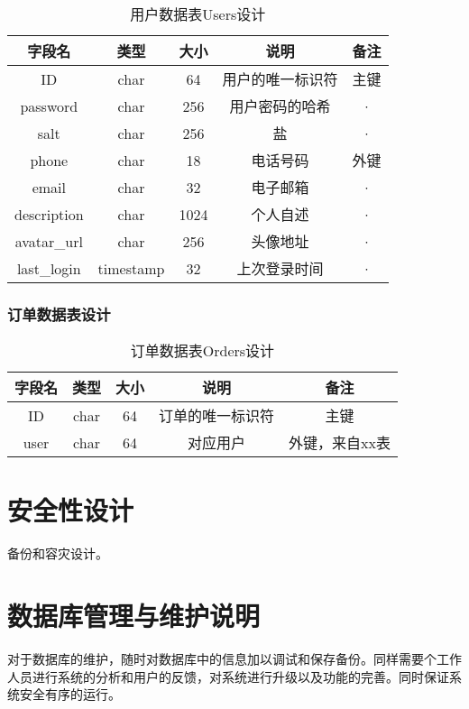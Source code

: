 \begin{table}[htbp]
\centering
\caption{用户数据表Users设计} \label{tab:client-database}
\begin{tabular}{|c|c|c|c|c|}
    \hline
    字段名 & 类型 & 大小 & 说明 & 备注 \\
    \hline
    ID & char & 64 & 用户的唯一标识符 & 主键\\
    \hline
    password & char & 256 & 用户密码的哈希 & · \\
    \hline
    salt & char & 256 & 盐 & · \\
    \hline
    phone & char & 18 & 电话号码 & 外键 \\
    \hline
    email & char & 32 & 电子邮箱 & · \\
    \hline
    description & char & 1024 & 个人自述 & · \\
    \hline
    avatar\_url & char & 256 & 头像地址 & · \\
    \hline
    last\_login & timestamp & 32 & 上次登录时间 & · \\
    \hline
\end{tabular}
\end{table}

\subsubsection{订单数据表设计}
\begin{table}[htbp]
\centering
\caption{订单数据表Orders设计} \label{tab:order-database}
\begin{tabular}{|c|c|c|c|c|}
    \hline
    字段名 & 类型 & 大小 & 说明 & 备注 \\
    \hline
    ID & char & 64 & 订单的唯一标识符 & 主键\\
    \hline
    user & char & 64 & 对应用户 & 外键，来自xx表 \\
    \hline
\end{tabular}
\end{table}
\section{安全性设计}
备份和容灾设计。

\section{数据库管理与维护说明}
对于数据库的维护，随时对数据库中的信息加以调试和保存备份。同样需要个工作人员进行系统的分析和用户的反馈，对系统进行升级以及功能的完善。同时保证系统安全有序的运行。